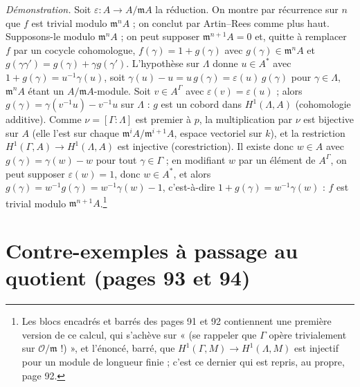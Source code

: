 \documentclass[11pt,a4paper]{article}
\begin{document}
\emph{Démonstration.} Soit $\varepsilon : A \to A/\mathfrak{m}A$ la réduction.
On montre par récurrence sur $n$ que $f$ est trivial modulo $\mathfrak{m}^{n}A$
; on conclut par Artin–Rees comme plus haut. Supposons-le modulo
$\mathfrak{m}^{n}A$ ; on peut supposer $\mathfrak{m}^{n+1}A = 0$ et, quitte à
remplacer $f$ par un cocycle cohomologue, $f(\gamma) = 1 + g(\gamma)$ avec
$g(\gamma) \in \mathfrak{m}^{n}A$ et $g(\gamma\gamma') = g(\gamma) + \gamma
g(\gamma')$. L'hypothèse sur $\Lambda$ donne $u \in A^{*}$ avec $1 + g(\gamma) =
u^{-1}\gamma(u)$, soit $\gamma(u) - u = u\,g(\gamma) = \varepsilon(u)\,g(\gamma)$
pour $\gamma \in \Lambda$, $\mathfrak{m}^{n}A$ étant un $A/\mathfrak{m}A$-module.
Soit $v \in A^{\Gamma}$ avec $\varepsilon(v) = \varepsilon(u)$ ; alors
$g(\gamma) = \gamma(v^{-1}u) - v^{-1}u$ sur $\Lambda$ : $g$ est un cobord dans
$H^1(\Lambda, A)$ (cohomologie additive). Comme $\nu = [\Gamma : \Lambda]$ est
premier à $p$, la multiplication par $\nu$ est bijective sur $A$ (elle l'est
sur chaque $\mathfrak{m}^{i}A/\mathfrak{m}^{i+1}A$, espace vectoriel sur $k$),
et la restriction $H^1(\Gamma, A) \to H^1(\Lambda, A)$ est injective
(corestriction). Il existe donc $w \in A$ avec $g(\gamma) = \gamma(w) - w$ pour
tout $\gamma \in \Gamma$ ; en modifiant $w$ par un élément de $A^{\Gamma}$, on
peut supposer $\varepsilon(w) = 1$, donc $w \in A^{*}$, et alors $g(\gamma) =
w^{-1}g(\gamma) = w^{-1}\gamma(w) - 1$, c'est-à-dire $1 + g(\gamma) =
w^{-1}\gamma(w)$ : $f$ est trivial modulo $\mathfrak{m}^{n+1}A$.\footnote{Les
blocs encadrés et barrés des pages 91 et 92 contiennent une première version
de ce calcul, qui s'achève sur « (se rappeler que $\Gamma$ opère trivialement sur $\mathcal{O}/\mathfrak{m}$ !) », et l'énoncé, barré, que $H^1(\Gamma, M) \to
H^1(\Lambda, M)$ est injectif pour un module de longueur finie ; c'est ce
dernier qui est repris, au propre, page 92.}

\section*{Contre-exemples à passage au quotient (pages 93 et 94)}
\end{document}
